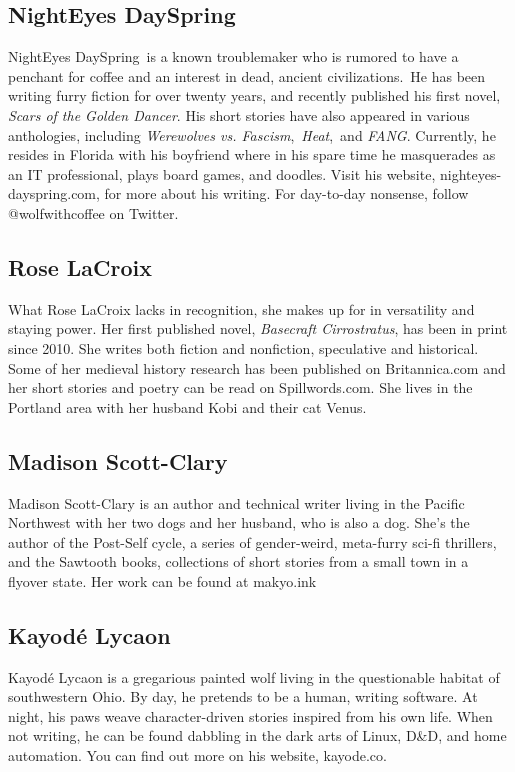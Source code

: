 \subsection*{NightEyes DaySpring}
NightEyes DaySpring is a known troublemaker who is rumored to have a penchant for coffee and an interest in dead, ancient civilizations. He has been writing furry fiction for over twenty years, and recently published his first novel, \emph{Scars of the Golden Dancer}. His short stories have also appeared in various anthologies, including \emph{Werewolves vs. Fascism}, \emph{Heat}, and \emph{FANG}. Currently, he resides in Florida with his boyfriend where in his spare time he masquerades as an IT professional, plays board games, and doodles. Visit his website, nighteyes-dayspring.com, for more about his writing. For day-to-day nonsense, follow @wolfwithcoffee on Twitter.

\subsection*{Rose LaCroix}

What Rose LaCroix lacks in recognition, she makes up for in versatility and staying power. Her first published novel, \emph{Basecraft Cirrostratus}, has been in print since 2010. She writes both fiction and nonfiction, speculative and historical. Some of her medieval history research has been published on Britannica.com and her short stories and poetry can be read on Spillwords.com. She lives in the Portland area with her husband Kobi and their cat Venus.

\subsection*{Madison Scott-Clary}
Madison Scott-Clary is an author and technical writer living in the Pacific Northwest with her two dogs and her husband, who is also a dog. She's the author of the Post-Self cycle, a series of gender-weird, meta-furry sci-fi thrillers, and the Sawtooth books, collections of short stories from a small town in a flyover state. Her work can be found at makyo.ink

\subsection*{Kayodé Lycaon}
Kayodé Lycaon is a gregarious painted wolf living in the questionable habitat of southwestern Ohio. By day, he pretends to be a \mbox{human}, writing software. At night, his paws weave character-driven stories inspired from his own life. When not writing, he can be found dabbling in the dark arts of Linux, D\&D, and home automation. You can find out more on his website, kayode.co.

